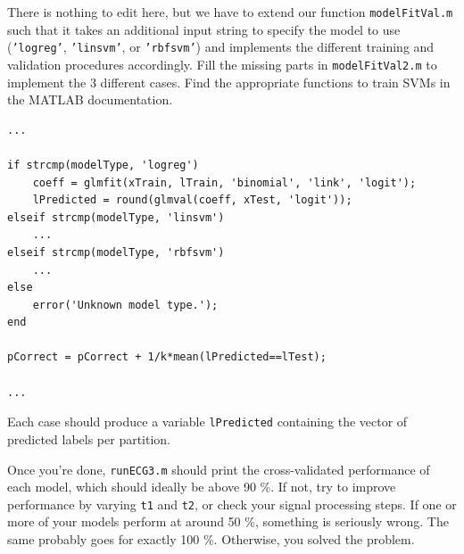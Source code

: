 \documentclass[10pt,a4paper,notitlepage]{report}
\begin{document}
There is nothing to edit here, but we have to extend our function \texttt{modelFitVal.m} such that it takes an additional input string to specify the model to use (\texttt{'logreg'}, \texttt{'linsvm'}, or \texttt{'rbfsvm'}) and implements the different training and validation procedures accordingly. Fill the missing parts in \texttt{modelFitVal2.m} to implement the 3 different cases. Find the appropriate functions to train SVMs in the MATLAB documentation.

\begin{verbatim}
...

if strcmp(modelType, 'logreg')
    coeff = glmfit(xTrain, lTrain, 'binomial', 'link', 'logit');
    lPredicted = round(glmval(coeff, xTest, 'logit'));
elseif strcmp(modelType, 'linsvm')
    ...
elseif strcmp(modelType, 'rbfsvm')
    ...
else
    error('Unknown model type.');
end

pCorrect = pCorrect + 1/k*mean(lPredicted==lTest);

...
\end{verbatim}

Each case should produce a variable \texttt{lPredicted} containing the vector of predicted labels per partition.

Once you're done, \texttt{runECG3.m} should print the cross-validated performance of each model, which should ideally be above 90 \%. If not, try to improve performance by varying \texttt{t1} and \texttt{t2}, or check your signal processing steps. If one or more of your models perform at around 50 \%, something is seriously wrong. The same probably goes for exactly 100 \%. Otherwise, you solved the problem.
\end{document}
